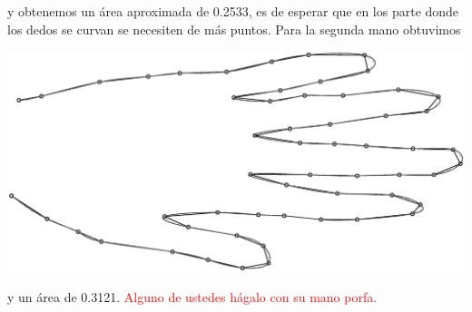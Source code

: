 \begin{solution}
y obtenemos un área aproximada de 0.2533, es de esperar que en los parte donde los dedos se curvan se necesiten de más puntos. Para la segunda mano obtuvimos

\begin{center}
    \includegraphics[scale=0.25]{Graficas/Mano2.eps}
\end{center}

y un área de 0.3121. \textcolor{red}{Alguno de ustedes hágalo con su mano porfa.}\\
\end{solution}

